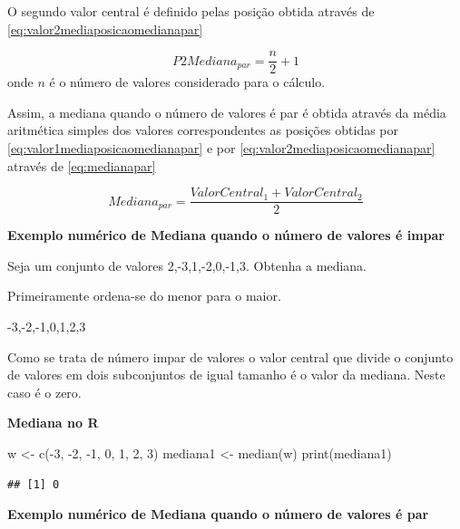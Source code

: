 \documentclass[
]{book}
\newenvironment{Shaded}{\begin{snugshade}}{\end{snugshade}}
\newcommand{\DecValTok}[1]{\textcolor[rgb]{0.00,0.00,0.81}{#1}}
\newcommand{\FunctionTok}[1]{\textcolor[rgb]{0.00,0.00,0.00}{#1}}
\newcommand{\NormalTok}[1]{#1}
\newcommand{\OtherTok}[1]{\textcolor[rgb]{0.56,0.35,0.01}{#1}}
\newcommand{\SpecialCharTok}[1]{\textcolor[rgb]{0.00,0.00,0.00}{#1}}
\begin{document}
O segundo valor central é definido pelas posição obtida através de
\eqref{eq:valor2mediaposicaomedianapar}

\begin{equation}
  P2Mediana_{par} = \dfrac{n}{2} + 1
  \label{eq:valor2mediaposicaomedianapar}
\end{equation}
onde \(n\) é o número de valores considerado para o cálculo.

Assim, a mediana quando o número de valores é par é obtida através da média aritmética simples dos valores correspondentes as posições obtidas por \eqref{eq:valor1mediaposicaomedianapar} e por
\eqref{eq:valor2mediaposicaomedianapar} através de \eqref{eq:medianapar}

\begin{equation}
  Mediana_{par} = \dfrac{ValorCentral_1 + ValorCentral_2}{2}
  \label{eq:medianapar}
\end{equation}

\textbf{Exemplo numérico de Mediana quando o número de valores é impar}

Seja um conjunto de valores 2,-3,1,-2,0,-1,3. Obtenha a mediana.

Primeiramente ordena-se do menor para o maior.

-3,-2,-1,0,1,2,3

Como se trata de número impar de valores o valor central que divide o conjunto de valores em dois subconjuntos de igual tamanho é o valor da mediana. Neste caso é o zero.

\textbf{Mediana no R}

\begin{Shaded}
\begin{Highlighting}[]
\NormalTok{w }\OtherTok{\textless{}{-}} \FunctionTok{c}\NormalTok{(}\SpecialCharTok{{-}}\DecValTok{3}\NormalTok{, }\SpecialCharTok{{-}}\DecValTok{2}\NormalTok{, }\SpecialCharTok{{-}}\DecValTok{1}\NormalTok{, }\DecValTok{0}\NormalTok{, }\DecValTok{1}\NormalTok{, }\DecValTok{2}\NormalTok{, }\DecValTok{3}\NormalTok{)}
\NormalTok{mediana1 }\OtherTok{\textless{}{-}} \FunctionTok{median}\NormalTok{(w)}
\FunctionTok{print}\NormalTok{(mediana1)}
\end{Highlighting}
\end{Shaded}

\begin{verbatim}
## [1] 0
\end{verbatim}

\textbf{Exemplo numérico de Mediana quando o número de valores é par}
\end{document}
